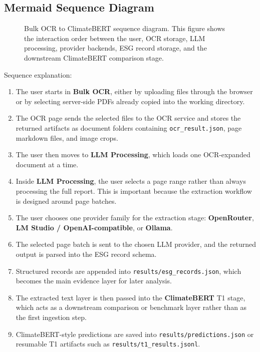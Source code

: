 \subsection{Mermaid Sequence Diagram}\label{mermaid-sequence-diagram}

\begin{figure}[ht]
\begin{center}
\end{center}
\caption{Bulk OCR to ClimateBERT sequence diagram. This figure shows the interaction order between the user, OCR storage, LLM processing, provider backends, ESG record storage, and the downstream ClimateBERT comparison stage.}
\label{fig:appendix_bulkocr_llm_climatebert_sequence}
\end{figure}

Sequence explanation:

\begin{enumerate}
\def\labelenumi{\arabic{enumi}.}
\tightlist
\item
  The user starts in \textbf{Bulk OCR}, either by uploading files through the browser or by selecting server-side PDFs already copied into the working directory.
\item
  The OCR page sends the selected files to the OCR service and stores the returned artifacts as document folders containing \texttt{ocr\_result.json}, page markdown files, and image crops.
\item
  The user then moves to \textbf{LLM Processing}, which loads one OCR-expanded document at a time.
\item
  Inside \textbf{LLM Processing}, the user selects a page range rather than always processing the full report. This is important because the extraction workflow is designed around page batches.
\item
  The user chooses one provider family for the extraction stage: \textbf{OpenRouter}, \textbf{LM Studio / OpenAI-compatible}, or \textbf{Ollama}.
\item
  The selected page batch is sent to the chosen LLM provider, and the returned output is parsed into the ESG record schema.
\item
  Structured records are appended into \texttt{results/esg\_records.json}, which becomes the main evidence layer for later analysis.
\item
  The extracted text layer is then passed into the \textbf{ClimateBERT} T1 stage, which acts as a downstream comparison or benchmark layer rather than as the first ingestion step.
\item
  ClimateBERT-style predictions are saved into \texttt{results/predictions.json} or resumable T1 artifacts such as \texttt{results/t1\_results.jsonl}.
\end{enumerate}

